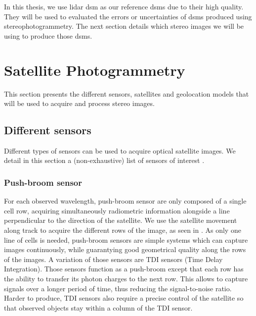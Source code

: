 In this thesis, we use \acrshort{lidar} \acrshort{dsm} as our reference \acrshort{dsm}s due to their high quality. They will be used to evaluated the errors or uncertainties of \acrshort{dsm}s produced using stereophotogrammetry. The next section details which stereo images we will be using to produce those \acrshort{dsm}s. 

\section{Satellite Photogrammetry}\label{sec:co3d}
This section presents the different sensors, satellites and geolocation models that will be used to acquire and process stereo images.

\subsection{Different sensors}
Different types of sensors can be used to acquire optical satellite images. We detail in this section a (non-exhaustive) list of sensors of interest \cite{cnes_imagerie_2008}.

\subsubsection{Push-broom sensor}
For each observed wavelength, push-broom sensor are only composed of a single cell row, acquiring simultaneously radiometric information alongside a line perpendicular to the direction of the satellite. We use the satellite movement along track to acquire the different rows of the image, as seen in . As only one line of cells is needed, push-broom sensors are simple systems which can capture images continuously, while guarantying good geometrical quality along the rows of the images. A variation of those sensors are TDI sensors (Time Delay Integration). Those sensors function as a push-broom except that each row has the ability to transfer its photon charges to the next row. This allows to capture signals over a longer period of time,  thus reducing the signal-to-noise ratio. Harder to produce, TDI sensors also require a precise control of the satellite so that observed objects stay within a column of the TDI sensor. 

